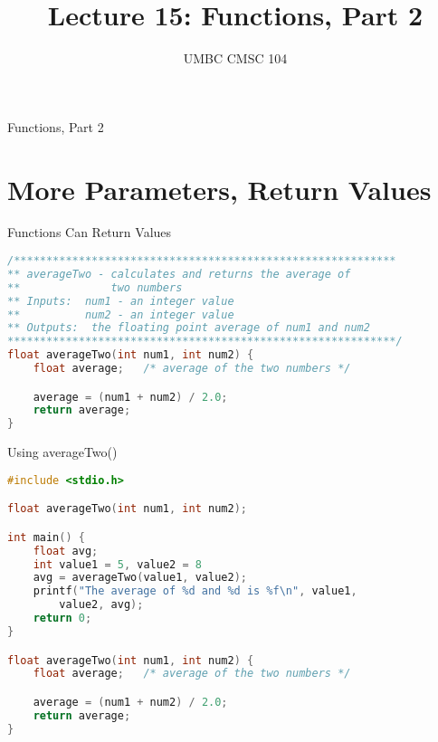 \documentclass[graphics]{beamer}
\title{Lecture 15: Functions, Part 2}
\author{UMBC CMSC 104}
\date{}
\begin{document}
\begin{frame}{}
\centering
    Functions, Part 2
\end{frame}

\frame{\tableofcontents}

\section{More Parameters, Return Values}
\begin{frame}[fragile]{Functions Can Return Values}
    \begin{lstlisting}[language=C,basicstyle=\footnotesize,keywordstyle=\color{blue},commentstyle=\color{green},showstringspaces=false,stringstyle=\color{red}]
/***********************************************************
** averageTwo - calculates and returns the average of
**              two numbers
** Inputs:  num1 - an integer value
**          num2 - an integer value
** Outputs:  the floating point average of num1 and num2
************************************************************/
float averageTwo(int num1, int num2) {
	float average;   /* average of the two numbers */

	average = (num1 + num2) / 2.0;
	return average;
}
    \end{lstlisting}
\end{frame}

\begin{frame}[fragile]{Using averageTwo()}
    \begin{lstlisting}[language=C,basicstyle=\footnotesize,keywordstyle=\color{blue},commentstyle=\color{green},showstringspaces=false,stringstyle=\color{red}]
#include <stdio.h>

float averageTwo(int num1, int num2);

int main() {
    float avg;
    int value1 = 5, value2 = 8
    avg = averageTwo(value1, value2);
    printf("The average of %d and %d is %f\n", value1,
        value2, avg);
    return 0;
}

float averageTwo(int num1, int num2) {
	float average;   /* average of the two numbers */

	average = (num1 + num2) / 2.0;
	return average;
}
    \end{lstlisting}
\end{frame}
\end{document}
